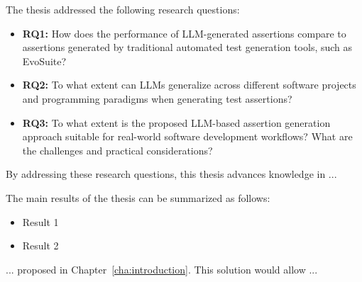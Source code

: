 The thesis addressed the following research questions:

\begin{itemize}
    \item \textbf{RQ1:} How does the performance of LLM-generated assertions compare to assertions generated by traditional automated test generation tools, such as EvoSuite?

    \item \textbf{RQ2:} To what extent can LLMs generalize across different software projects and programming paradigms when generating test assertions?
    
    \item \textbf{RQ3:} To what extent is the proposed LLM-based assertion generation approach suitable for real-world software development workflows? What are the challenges and practical considerations?
\end{itemize}

By addressing these research questions, this thesis advances knowledge in ...

The main results of the thesis can be summarized as follows:
\begin{itemize}
  \item Result 1
  \item Result 2
\end{itemize}

... proposed in Chapter~\ref{cha:introduction}. This solution would allow ...